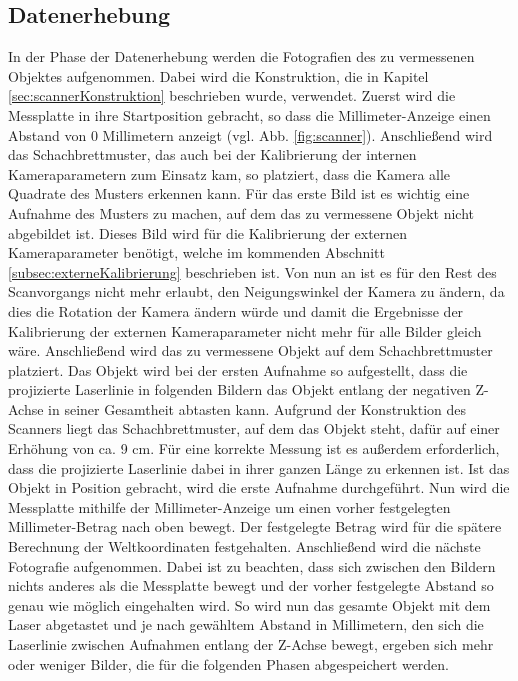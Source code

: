 \subsection{Datenerhebung}
\label{subsec:Datenerhebung}
In der Phase der Datenerhebung werden die Fotografien des zu vermessenen Objektes aufgenommen. Dabei wird die Konstruktion, die in Kapitel \ref{sec:scannerKonstruktion} beschrieben wurde, verwendet. Zuerst wird die Messplatte in ihre Startposition gebracht, so dass die Millimeter-Anzeige einen Abstand von 0 Millimetern anzeigt (vgl. Abb. \ref{fig:scanner}). Anschließend wird das Schachbrettmuster, das auch bei der Kalibrierung der internen Kameraparametern zum Einsatz kam, so platziert, dass die Kamera alle Quadrate des Musters erkennen kann. Für das erste Bild ist es wichtig eine Aufnahme des Musters zu machen, auf dem das zu vermessene Objekt nicht abgebildet ist. Dieses Bild wird für die Kalibrierung der externen Kameraparameter benötigt, welche im kommenden Abschnitt \ref{subsec:externeKalibrierung} beschrieben ist. Von nun an ist es für den Rest des Scanvorgangs nicht mehr erlaubt, den Neigungswinkel der Kamera zu ändern, da dies die Rotation der Kamera ändern würde und damit die Ergebnisse der Kalibrierung der externen Kameraparameter nicht mehr für alle Bilder gleich wäre.\newline
Anschließend wird das zu vermessene Objekt auf dem Schachbrettmuster platziert. Das Objekt wird bei der ersten Aufnahme so aufgestellt, dass die projizierte Laserlinie in folgenden Bildern das Objekt entlang der negativen Z-Achse in seiner Gesamtheit abtasten kann. Aufgrund der Konstruktion des Scanners liegt das Schachbrettmuster, auf dem das Objekt steht, dafür auf einer Erhöhung von ca. 9 cm. Für eine korrekte Messung ist es außerdem erforderlich, dass die projizierte Laserlinie dabei in ihrer ganzen Länge zu erkennen ist. Ist das Objekt in Position gebracht, wird die erste Aufnahme durchgeführt. Nun wird die Messplatte mithilfe der Millimeter-Anzeige um einen vorher festgelegten Millimeter-Betrag nach oben bewegt. Der festgelegte Betrag wird für die spätere Berechnung der Weltkoordinaten festgehalten. Anschließend wird die nächste Fotografie aufgenommen. Dabei ist zu beachten, dass sich zwischen den Bildern nichts anderes als die Messplatte bewegt und der vorher festgelegte Abstand so genau wie möglich eingehalten wird. So wird nun das gesamte Objekt mit dem Laser abgetastet und je nach gewähltem Abstand in Millimetern, den sich die Laserlinie zwischen Aufnahmen entlang der Z-Achse bewegt, ergeben sich mehr oder weniger Bilder, die für die folgenden Phasen abgespeichert werden.      

